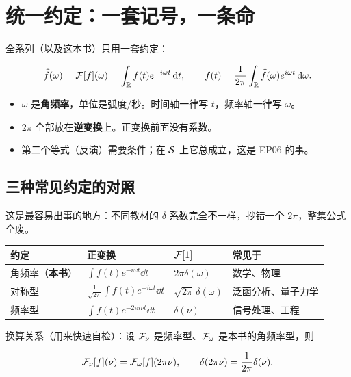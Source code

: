 \section{统一约定：一套记号，一条命}

全系列（以及这本书）只用一套约定：

\begin{equation}
\widehat{f}(\omega)=\mathcal{F}[f](\omega)=\int_{\mathbb{R}}f(t)e^{-i\omega t}\mathop{}\!\mathrm{d} t,
\qquad
f(t)=\frac{1}{2\pi}\int_{\mathbb{R}}\widehat{f}(\omega)e^{i\omega t}\mathop{}\!\mathrm{d}\omega. \label{eq:conv}
\end{equation}

\begin{itemize}[leftmargin=1.6em,itemsep=0.3em]
\item $\omega$ 是\textbf{角频率}，单位是弧度/秒。时间轴一律写 $t$，频率轴一律写 $\omega$。
\item $2\pi$ 全部放在\textbf{逆变换}上。正变换前面没有系数。
\item 第二个等式（反演）需要条件；在 $\mathcal{S}$ 上它总成立，这是 EP06 的事。
\end{itemize}

\subsection*{三种常见约定的对照}

这是最容易出事的地方：不同教材的 $\delta$ 系数完全不一样，抄错一个 $2\pi$，整集公式全废。

\begin{center}
\small
\renewcommand{\arraystretch}{1.55}
\begin{tabularx}{\textwidth}{@{}L{2.6cm}L{4.3cm}L{3.4cm}L{3.6cm}@{}}
\toprule
约定 & 正变换 & $\mathcal{F}[1]$ & 常见于 \\
\midrule
角频率（\textbf{本书}） & $\displaystyle\int f(t)e^{-i\omega t}\dd t$ & $2\pi\delta(\omega)$ & 数学、物理 \\
对称型 & $\displaystyle\frac{1}{\sqrt{2\pi}}\int f(t)e^{-i\omega t}\dd t$ & $\sqrt{2\pi}\,\delta(\omega)$ & 泛函分析、量子力学 \\
频率型 & $\displaystyle\int f(t)e^{-2\pi i\nu t}\dd t$ & $\delta(\nu)$ & 信号处理、工程 \\
\bottomrule
\end{tabularx}
\end{center}

换算关系（用来快速自检）：设 $\mathcal{F}_\nu$ 是频率型、$\mathcal{F}_\omega$ 是本书的角频率型，则

\begin{equation}
\mathcal{F}_\nu[f](\nu)=\mathcal{F}_\omega[f](2\pi\nu),
\qquad
\delta(2\pi\nu)=\frac{1}{2\pi}\delta(\nu). \label{eq:conversion}
\end{equation}

